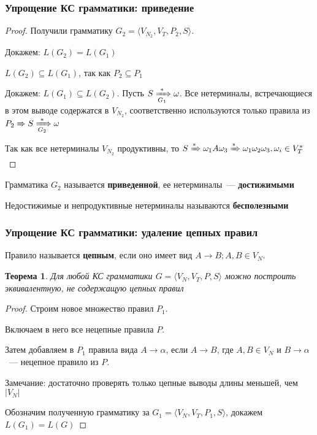 \documentclass{beamer}
\newtheorem{rutheorem}{Теорема}
\newcommand{\derives}[1][*]{\xRightarrow[]{#1}}
\newcommand{\deriveg}[1]{\xRightarrow[#1]{*}}
\begin{document}
\begin{frame}[fragile]
  \transwipe[direction=90]
  \frametitle{Упрощение КС грамматики: приведение}
   \begin{proof}
   Получили грамматику $G_2 = \langle V_{N_2}, V_T, P_2, S\rangle$.

   Докажем: $L(G_2) = L(G_1)$

   $L(G_2) \subseteq L(G_1)$, так как $P_2 \subseteq P_1$

   Докажем: $L(G_1) \subseteq L(G_2)$. Пусть $S \deriveg{G_1} \omega$. Все нетерминалы, встречающиеся в этом выводе содержатся в $V_{N_2}$, соответственно используются только правила из $ P_2 \derives[] S \deriveg{G_2} \omega $

   Так как все нетерминалы $V_{N_2}$ продуктивны, то  $S \derives \omega_1 A \omega_3 \derives \omega_1 \omega_2 \omega_3, \omega_i \in V_T^*$


   \end{proof}

   Грамматика $G_2$ называется \textbf{приведенной}, ее нетерминалы~--- \textbf{достижимыми}

   Недостижимые и непродуктивные нетерминалы называются \textbf{бесполезными}
\end{frame}

\begin{frame}[fragile]
  \transwipe[direction=90]
  \frametitle{Упрощение КС грамматики: удаление цепных правил}
  Правило называется \textbf{цепным}, если оно имеет вид $A \to B; A, B \in V_N$.

  \begin{rutheorem}
    Для любой КС грамматики $G=\langle V_N, V_T, P, S \rangle$ можно построить эквивалентную, не содержащую цепных правил
  \end{rutheorem}

   \begin{proof}
   Строим новое множество правил $P_1$.

   Включаем в него все нецепные правила  $P$.

   Затем добавляем в $P_1$ правила вида $A \to \alpha$, если $A \to B$, где $A, B \in V_N$ и $B \to \alpha$~--- нецепное правило из $P$.

   Замечание: достаточно проверять только цепные выводы длины меньшей, чем $|V_N|$

   Обозначим полученную грамматику за $G_1=\langle V_N, V_T, P_1, S \rangle$, докажем $L(G_1)=L(G)$
      \end{proof}
\end{frame}
\end{document}
